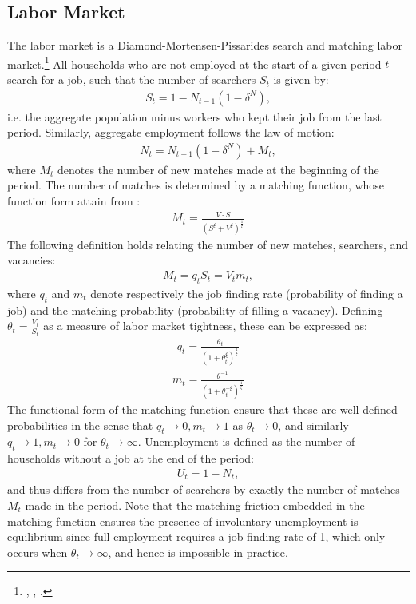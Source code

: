 \subsection{Labor Market}
The labor market is a Diamond-Mortensen-Pissarides search and matching labor market.\footnote{\citet{diamond1982aggregate}, \citet{mortensen1982matching}, \citet{pissarides1985short}.} All households who are not employed at the start of a given period $t$ search for a job, such that the number of searchers $S_t$ is given by: 
\begin{gather*}
S_{t}=1-N_{t-1}\left(1-\delta^{N}\right),
\end{gather*}
i.e. the aggregate population minus workers who kept their job from the last period. Similarly, aggregate employment follows the law of motion:
\begin{gather*}
N_{t}=N_{t-1}\left(1-\delta^{N}\right)+M_{t},
\end{gather*}
where $M_{t}$ denotes the number of new matches made at the beginning of the period. The number of matches is determined by a matching function, whose function form attain from \citet{den2000job}:
\begin{gather*} 
M_{t}=\frac{V\cdot S}{\left(S^{\xi}+V^{\xi}\right)^{\frac{1}{\xi}}}       
\end{gather*}
The following definition holds relating the number of new matches, searchers, and vacancies:
\begin{gather*}
M_{t}=q_{t}S_{t}=V_{t}m_{t},
\end{gather*}
where $q_t$ and $m_t$ denote respectively the job finding rate (probability of finding a job) and the matching probability (probability of filling a vacancy). Defining $\theta_{t}=\frac{V_{t}}{S_{t}}$ as a measure of labor market tightness, these can be expressed as:
\begin{gather*}
q_{t}=\frac{\theta_{t}}{\left(1+\theta_{t}^{\xi}\right)^{\frac{1}{\xi}}} 
\end{gather*}
\begin{gather*}
m_{t}=\frac{\theta^{-1}}{\left(1+\theta_{t}^{-\xi}\right)^{\frac{1}{\xi}}}
\end{gather*}
The functional form of the matching function ensure that these are well defined probabilities in the sense that $q_{t}\rightarrow0,m_{t}\rightarrow1$ as $\theta_{t}\rightarrow0$, and similarly $q_{t}\rightarrow1,m_{t}\rightarrow0$ for $\theta_{t}\rightarrow\infty$. 
Unemployment is defined as the number of households without a job at the end of the period: 
\begin{gather*}
U_{t}=1-N_{t},  
\end{gather*}
and thus differs from the number of searchers by exactly the number of matches $M_t$ made in the period. Note that the matching friction embedded in the matching function ensures the presence of involuntary unemployment is equilibrium since full employment requires a job-finding rate of 1, which only occurs when $\theta_{t}\rightarrow\infty$, and hence is impossible in practice. 




